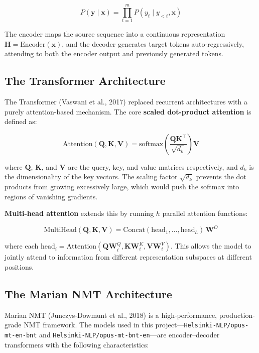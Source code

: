\documentclass[12pt,a4paper]{article}
\begin{document}
\begin{equation}
    P(\mathbf{y} \mid \mathbf{x}) = \prod_{t=1}^{m} P(y_t \mid y_{<t}, \mathbf{x})
\end{equation}

The encoder maps the source sequence into a continuous representation \(\mathbf{H} = \text{Encoder}(\mathbf{x})\), and the decoder generates target tokens auto-regressively, attending to both the encoder output and previously generated tokens.

\subsection{The Transformer Architecture}

The Transformer (Vaswani et al., 2017) replaced recurrent architectures with a purely attention-based mechanism. The core \textbf{scaled dot-product attention} is defined as:

\begin{equation}
    \text{Attention}(\mathbf{Q}, \mathbf{K}, \mathbf{V}) = \text{softmax}\!\left(\frac{\mathbf{Q}\mathbf{K}^\top}{\sqrt{d_k}}\right)\mathbf{V}
\end{equation}

where \(\mathbf{Q}\), \(\mathbf{K}\), and \(\mathbf{V}\) are the query, key, and value matrices respectively, and \(d_k\) is the dimensionality of the key vectors. The scaling factor \(\sqrt{d_k}\) prevents the dot products from growing excessively large, which would push the softmax into regions of vanishing gradients.

\textbf{Multi-head attention} extends this by running \(h\) parallel attention functions:

\begin{equation}
    \text{MultiHead}(\mathbf{Q}, \mathbf{K}, \mathbf{V}) = \text{Concat}(\text{head}_1, \ldots, \text{head}_h)\,\mathbf{W}^O
\end{equation}

where each \(\text{head}_i = \text{Attention}(\mathbf{Q}\mathbf{W}_i^Q, \mathbf{K}\mathbf{W}_i^K, \mathbf{V}\mathbf{W}_i^V)\). This allows the model to jointly attend to information from different representation subspaces at different positions.

\subsection{The Marian NMT Architecture}

Marian NMT (Junczys-Dowmunt et al., 2018) is a high-performance, production-grade NMT framework. The models used in this project---\texttt{Helsinki-NLP/opus-mt-en-bnt} and \texttt{Helsinki-NLP/opus-mt-bnt-en}---are encoder--decoder transformers with the following characteristics:
\end{document}
